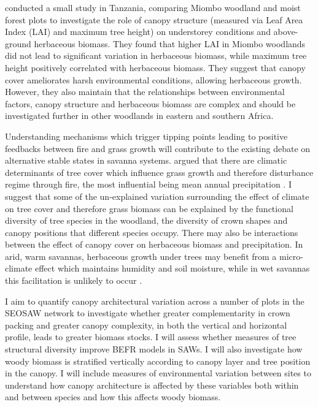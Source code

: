 \documentclass[11pt,a4paper]{article}
\begin{document}
\citet{Shirima2015a} conducted a small study in Tanzania, comparing Miombo woodland and moist forest plots to investigate the role of canopy structure (measured via Leaf Area Index (LAI) and maximum tree height) on understorey conditions and above-ground herbaceous biomass. They found that higher LAI in Miombo woodlands did not lead to significant variation in herbaceous biomass, while maximum tree height positively correlated with herbaceous biomass. They suggest that canopy cover ameliorates harsh environmental conditions, allowing herbaceous growth. However, they also maintain that the relationships between environmental factors, canopy structure and herbaceous biomass are complex and should be investigated further in other woodlands in eastern and southern Africa.

Understanding mechanisms which trigger tipping points leading to positive feedbacks between fire and grass growth will contribute to the existing debate on alternative stable states in savanna systems. \citet{Hirota2011} argued that there are climatic determinants of tree cover which influence grass growth and therefore disturbance regime through fire, the most influential being mean annual precipitation \citep{Sankaran2005}. I suggest that some of the un-explained variation surrounding the effect of climate on tree cover and therefore grass biomass can be explained by the functional diversity of tree species in the woodland, the diversity of crown shapes and canopy positions that different species occupy. There may also be interactions between the effect of canopy cover on herbaceous biomass and precipitation. In arid, warm savannas, herbaceous growth under trees may benefit from a micro-climate effect which maintains humidity and soil moisture, while in wet savannas this facilitation is unlikely to occur \citep{Dohn2013}. 

I aim to quantify canopy architectural variation across a number of plots in the SEOSAW network to investigate whether greater complementarity in crown packing and greater canopy complexity, in both the vertical and horizontal profile, leads to greater biomass stocks. I will assess whether measures of tree structural diversity improve BEFR models in SAWs. I will also investigate how woody biomass is stratified vertically according to canopy layer and tree position in the canopy. I will include measures of environmental variation between sites to understand how canopy architecture is affected by these variables both within and between species and how this affects woody biomass. 
\end{document}

